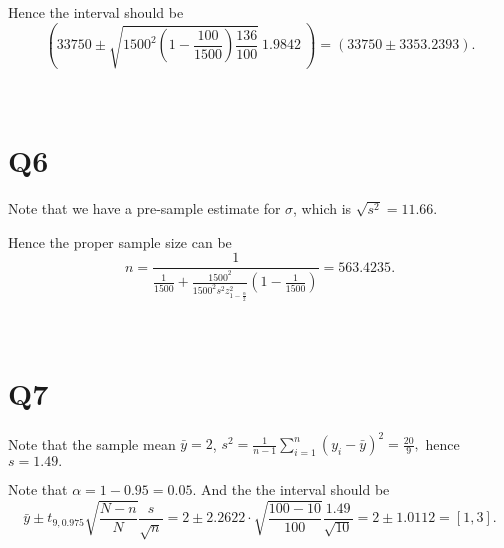 \documentclass[12pt]{article}%
\begin{document}
Hence the interval should be $$(33750\pm \sqrt{1500^2(1-\frac{100}{1500})\frac{136}{100}}~1.9842~)=(33750\pm 3353.2393).$$

~ \ 

\section{Q6}

Note that we have a pre-sample estimate for $\sigma$, which is $\sqrt{s^2}=11.66.$

Hence the proper sample size can be $$n=\frac{1}{\frac{1}{1500}+\frac{1500^2}{1500^2s^2z_{1-\frac{\alpha}{2}}^2}(1-\frac{1}{1500})}=563.4235.$$ 

~\ 

\section{Q7}

Note that the sample mean $\bar{y}=2$, $s^2=\frac{1}{n-1}\sum_{i=1}^{n}(y_i-\bar{y})^2=\frac{20}{9},$ hence $s=1.49.$

Note that $\alpha=1-0.95=0.05.$ And the the interval should be $$\bar{y}\pm t_{9,0.975}\sqrt{\frac{N-n}{N}}\frac{s}{\sqrt{n}}=2\pm 2.2622\cdot \sqrt{\frac{100-10}{100}}\frac{1.49}{\sqrt{10}}=2\pm 1.0112=[1,3].$$
\end{document}
